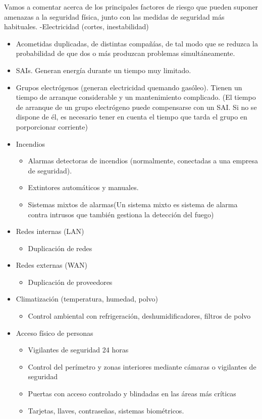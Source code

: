 \documentclass[a4paper]{article}
\begin{document}
Vamos a comentar acerca de los principales factores de riesgo que pueden suponer amenazas a la seguridad física, junto con las medidas de seguridad más habituales.
-Electricidad (cortes, inestabilidad)
\begin{itemize}
\item Acometidas duplicadas, de distintas compañías, de tal modo que se reduzca la probabilidad de que dos o más produzcan problemas simultáneamente.
\item SAIs. Generan energía durante un tiempo muy limitado.
\item Grupos electrógenos (generan electricidad quemando gasóleo). Tienen un tiempo de arranque considerable y un mantenimiento complicado.
(El tiempo de arranque de un grupo electrógeno puede compensarse con un SAI. Si no se dispone de él, es necesario tener en cuenta el tiempo que tarda el grupo en porporcionar corriente)
\end{itemize}
\begin{itemize}
\item Incendios
\begin{itemize}
\item Alarmas detectoras de incendios (normalmente, conectadas a una empresa de seguridad).
\item Extintores automáticos y manuales.
\item Sistemas mixtos de alarmas(Un sistema mixto es sistema de alarma contra intrusos que también gestiona la detección del fuego)
\end{itemize}
\item Redes internas (LAN)
\begin{itemize}
\item Duplicación de redes
\end{itemize}
\item Redes externas (WAN)
\begin{itemize}
\item Duplicación de proveedores
\end{itemize}
\item Climatización (temperatura, humedad, polvo)
\begin{itemize}
\item Control ambiental con refrigeración, deshumidificadores, filtros de polvo
\end{itemize}
\item Acceso físico de personas
\begin{itemize}
\item Vigilantes de seguridad 24 horas
\item Control del perímetro y zonas interiores mediante cámaras o vigilantes de seguridad
\item Puertas con acceso controlado y blindadas en las áreas más críticas
\item Tarjetas, llaves, contraseñas, sistemas biométricos.
\end{itemize}
\end{itemize}
\end{document}
